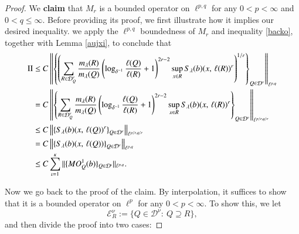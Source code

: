 \documentclass[12pt]{amsart}
\begin{document}
\begin{proof}
We {\bf claim} that $M_r$ is a bounded operator on $\ell^{p,q}$ for any $0<p<\infty$ and $0<q\leq \infty$. Before providing its proof, we first illustrate how it implies our desired inequality. we apply the $\ell^{p,q}$ boundedness of $M_r$ and inequality \eqref{backo}, together with Lemma \ref{aujxi}, to conclude that
\begin{align*}
{\rm II}&\leq C \left\|\left\{\left(\sum_{R\in\mathcal{D}_{Q}^\nu}\frac{m_\lambda(R)}{m_\lambda(Q)}\left(\log_{\delta^{-1}}\frac{\ell(Q)}{\ell(R)}+1\right)^{2r-2}\sup\limits_{x\in R}S_\lambda(b)(x,\,\ell(R))^r \right)^{1/r}\right\}_{Q\in\mathcal{D}^\nu}\right\|_{\ell^{p,q}}\\
&= C \left\|\left\{\sum_{R\in\mathcal{D}_{Q}^\nu}\frac{m_\lambda(R)}{m_\lambda(Q)}\left(\log_{\delta^{-1}}\frac{\ell(Q)}{\ell(R)}+1\right)^{2r-2}\sup\limits_{x\in R}S_\lambda(b)(x,\,\ell(R))^r \right\}_{Q\in\mathcal{D}^\nu}\right\|_{\ell^{p/r,q/r}}\\
&\leq C\left\|\left\{S_\lambda(b)(x,\,\ell(Q))^r \right\}_{Q\in\mathcal{D}^\nu}\right\|_{\ell^{p/r,q/r}}\\
&=C\left\|\left\{S_\lambda(b)(x,\,\ell(Q)) \right\}_{Q\in\mathcal{D}^\nu}\right\|_{\ell^{p,q}}\\
&\leq C \sum_{\iota=1}^\kappa\|\{MO_Q^1(b)\}_{Q\in\mathcal{D}^\iota}\|_{\ell^{p,q}}.
\end{align*}

Now we go back to the proof of the claim. By interpolation, it suffices to show that it is a bounded operator on $\ell^p$ for any $0<p<\infty$. To show this, we let
$$\mathcal{E}_R^\nu:=\{Q\in\mathcal{D}^\nu:\ Q\supseteq R\},$$
and then divide the proof into two cases:



\end{proof}
\end{document}
